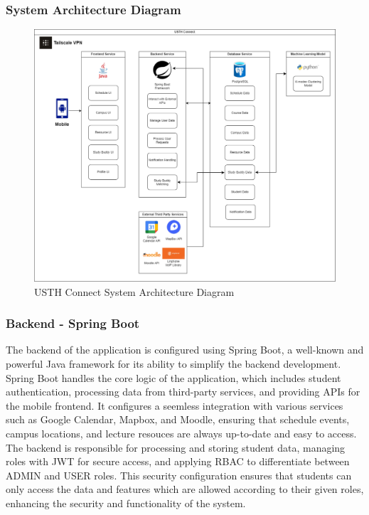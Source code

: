 \documentclass[12pt]{article}
\begin{document}
\subsubsection{System Architecture Diagram}
\begin{figure}[H]
    \centering
    \includegraphics[width=1\textwidth]{image/USTH-Connect-System-Architecture.pdf} 
    \caption{USTH Connect System Architecture Diagram}
\end{figure}

\subsubsection{Backend - Spring Boot}
The backend of the application is configured using Spring Boot, a well-known and powerful Java framework for its ability to simplify the backend development.
Spring Boot handles the core logic of the application, which includes student authentication, processing data from third-party services, and providing APIs for the mobile frontend.
It configures a seemless integration with various services such as Google Calendar, Mapbox, and Moodle, ensuring that schedule events, campus locations, and lecture resouces are always up-to-date and easy to access.
The backend is responsible for processing and storing student data, managing roles with JWT for secure access, and applying RBAC to differentiate between ADMIN and USER roles.
This security configuration ensures that students can only access the data and features which are allowed according to their given roles, enhancing the security and functionality of the system.
\end{document}

